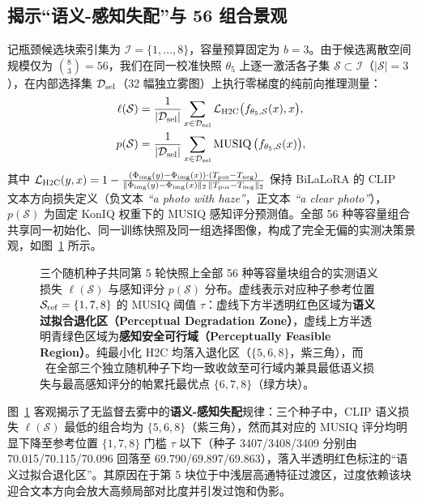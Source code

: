 \documentclass[10pt,twocolumn,letterpaper]{article}
\begin{document}
\subsection{揭示“语义-感知失配”与 56 组合景观}
记瓶颈候选块索引集为 $\mathcal I=\{1,\ldots,8\}$，容量预算固定为 $b=3$。由于候选离散空间规模仅为 $\binom83=56$，我们在同一校准快照 $\theta_5$ 上逐一激活各子集 $\mathcal S\subset\mathcal I$（$|\mathcal S|=3$），在内部选择集 $\mathcal D_{\rm sel}$（32 幅独立雾图）上执行零梯度的纯前向推理测量：
\begin{align}
\ell(\mathcal S)&=\frac{1}{|\mathcal D_{\rm sel}|}\sum_{x\in\mathcal D_{\rm sel}}
\mathcal L_{\rm H2C}\big(f_{\theta_5,\mathcal S}(x),x\big),\\
p(\mathcal S)&=\frac{1}{|\mathcal D_{\rm sel}|}\sum_{x\in\mathcal D_{\rm sel}}
\operatorname{MUSIQ}\big(f_{\theta_5,\mathcal S}(x)\big),
\end{align}
其中 $\mathcal L_{\rm H2C}(y,x)=1-\frac{(\Phi_{\rm img}(y)-\Phi_{\rm img}(x))\cdot(T_{\rm pos}-T_{\rm neg})}{\|\Phi_{\rm img}(y)-\Phi_{\rm img}(x)\|_2\,\|T_{\rm pos}-T_{\rm neg}\|_2}$ 保持 BiLaLoRA 的 CLIP~\cite{clip2021,bilalora2026} 文本方向损失定义（负文本 \textit{``a photo with haze''}，正文本 \textit{``a clear photo''}），$p(\mathcal S)$ 为固定 KonIQ 权重下的 MUSIQ 感知评分预测值。全部 56 种等容量组合共享同一初始化、同一训练快照及同一组选择图像，构成了完全无偏的实测决策景观，如图~\ref{fig:landscape} 所示。

\begin{figure}[t]
\centering
\caption{三个随机种子共同第 5 轮快照上全部 56 种等容量块组合的实测语义损失 $\ell(\mathcal S)$ 与感知评分 $p(\mathcal S)$ 分布。虚线表示对应种子参考位置 $\mathcal S_{\rm ref}=\{1,7,8\}$ 的 MUSIQ 阈值 $\tau$：虚线下方半透明红色区域为\textbf{语义过拟合退化区（Perceptual Degradation Zone）}，虚线上方半透明青绿色区域为\textbf{感知安全可行域（Perceptually Feasible Region）}。纯最小化 H2C 均落入退化区（$\{5,6,8\}$，紫三角），而 \method~在全部三个独立随机种子下均一致收敛至可行域内兼具最低语义损失与最高感知评分的帕累托最优点 $\{6,7,8\}$（绿方块）。}
\label{fig:landscape}
\end{figure}

图~\ref{fig:landscape} 客观揭示了无监督去雾中的\textbf{语义-感知失配}规律：三个种子中，CLIP 语义损失 $\ell(\mathcal S)$ 最低的组合均为 $\{5,6,8\}$（紫三角），然而其对应的 MUSIQ 评分均明显下降至参考位置 $\{1,7,8\}$ 门槛 $\tau$ 以下（种子 3407/3408/3409 分别由 70.015/70.115/70.096 回落至 69.790/69.897/69.863），落入半透明红色标注的“语义过拟合退化区”。其原因在于第 5 块位于中浅层高通特征过渡区，过度依赖该块迎合文本方向会放大高频局部对比度并引发过饱和伪影。
\end{document}
